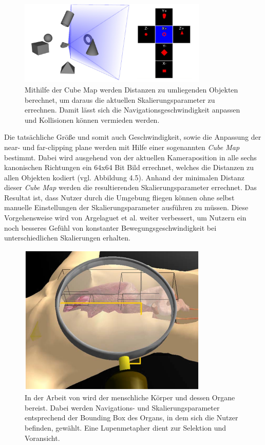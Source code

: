 \begin{figure}[h]
  \centering
  \includegraphics[width=0.8\textwidth]{images/cubemap2.png}
  \caption{Mithilfe der Cube Map werden Distanzen zu umliegenden Objekten berechnet, um daraus die aktuellen Skalierungsparameter zu errechnen. Damit lässt sich die Navigationsgeschwindigkeit anpassen und Kollisionen können vermieden werden. \cite{McCrae2009MultiscaleNavigation}}
  \label{fig:todo}
\end{figure}

Die tatsächliche Größe und somit auch Geschwindigkeit, sowie die Anpassung der near- und far-clipping plane werden mit Hilfe einer sogenannten \textit{Cube Map} bestimmt. Dabei wird ausgehend von der aktuellen Kameraposition in alle sechs kanonischen Richtungen ein 64x64 Bit Bild errechnet, welches die Distanzen zu allen Objekten kodiert (vgl. Abbildung 4.5). Anhand der minimalen Distanz dieser \textit{Cube Map} werden die resultierenden Skalierungsparameter errechnet.
Das Resultat ist, dass Nutzer durch die Umgebung fliegen können ohne selbst manuelle Einstellungen der Skalierungsparameter ausführen zu müssen. Diese Vorgehensweise wird von Argelaguet et al. \cite{Dallat2018Giant} weiter verbessert, um Nutzern ein noch besseres Gefühl von konstanter Bewegungsgeschwindigkeit bei unterschiedlichen Skalierungen erhalten.

\begin{figure}[h]
  \centering
  \includegraphics[width=0.8\textwidth]{images/body.png}
  \caption{In der Arbeit von \cite{Kopper2006DesignEnvironments} wird der menschliche Körper und dessen Organe bereist. Dabei werden Navigations- und Skalierungsparameter entsprechend der Bounding Box des Organs, in dem sich die Nutzer befinden, gewählt. Eine Lupenmetapher dient zur Selektion und Voransicht.}
  \label{fig:todo}
\end{figure}

